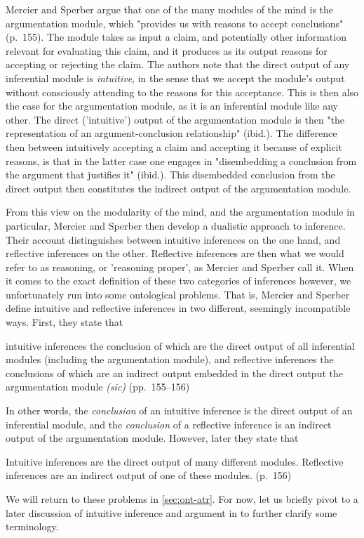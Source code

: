 Mercier and Sperber argue that one of the many modules of the mind is the argumentation module, which "provides us with reasons to accept conclusions" (p.~155). The module takes as input a claim, and potentially other information relevant for evaluating this claim, and it produces as its output reasons for accepting or rejecting the claim.
The authors note that the direct output of any inferential module is \emph{intuitive}, in the sense that we accept the module's output without consciously attending to the reasons for this acceptance. This is then also the case for the argumentation module, as it is an inferential module like any other. The direct ('intuitive') output of the argumentation module is then "the representation of an argument-conclusion relationship" (ibid.).
The difference then between intuitively accepting a claim and accepting it because of explicit reasons, is that in the latter case one engages in "disembedding a conclusion from the argument that justifies it" (ibid.).
This disembedded conclusion from the direct output then constitutes the indirect output of the argumentation module.

From this view on the modularity of the mind, and the argumentation module in particular, Mercier and Sperber then develop a dualistic approach to inference.
Their account distinguishes between intuitive inferences on the one hand, and reflective inferences on the other. Reflective inferences are then what we would refer to as reasoning, or 'reasoning proper', as Mercier and Sperber call it.
When it comes to the exact definition of these two categories of inferences however, we unfortunately run into some ontological problems.
That is, Mercier and Sperber define intuitive and reflective inferences in two different, seemingly incompatible ways. First, they state that
\begin{quoting}
    intuitive inferences the conclusion of which are the direct output of all inferential modules (including the argumentation module), and reflective inferences the conclusions of which are an indirect output embedded in the direct output the argumentation module \emph{(sic)}
    \hfill (pp.~155--156)
\end{quoting}
In other words, the \emph{conclusion} of an intuitive inference is the direct output of an inferential module, and the \emph{conclusion} of a reflective inference is an indirect output of the argumentation module. However, later they state that
\begin{quoting}
    Intuitive inferences are the direct output of many different modules. Reflective inferences are an indirect output of one of these modules.
    \hfill (p.~156)
\end{quoting}
We will return to these problems in \cref{sec:ont-atr}.
For now, let us briefly pivot to a later discussion of intuitive inference and argument in \citet[\S 1.1]{MS11} to further clarify some terminology.


